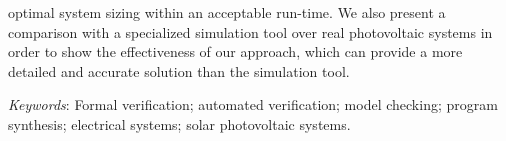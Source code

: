 optimal system sizing within an acceptable run-time. We also present a comparison with a specialized simulation tool over real photovoltaic systems in order to show the effectiveness of our approach, which can provide a more detailed and accurate solution than the simulation tool.

\textit{Keywords}: Formal verification; automated verification; model checking; program synthesis; electrical systems; solar photovoltaic systems.
